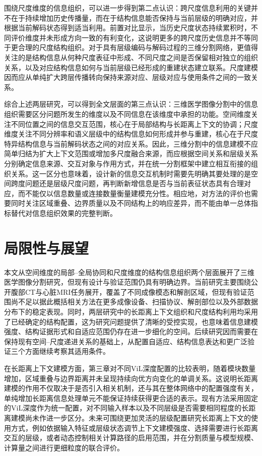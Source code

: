 围绕尺度维度的信息组织，可以进一步得到第二点认识：跨尺度信息利用的关键并不在于持续增加历史传播量，而在于结构信息能否保持与当前层级的明确对应，并根据当前解码状态得到适当利用。前置对比显示，当历史尺度状态持续累积时，不同评价维度并未形成方向一致的有利变化，这说明更多的跨尺度历史信息并不等同于更合理的尺度结构组织。对于具有层级编码与解码过程的三维分割网络，更值得关注的是结构信息从何种尺度表征中形成、不同尺度之间是否保留相对独立的组织关系，以及对应结构信息如何与当前层级已经形成的重建状态建立联系。尺度建模因而应从单纯扩大跨层传播转向保持来源对应、层级对应与使用条件之间的一致关系。

综合上述两层研究，可以得到全文层面的第三点认识：三维医学图像分割中的信息组织需要区分问题所发生的维度以及不同信息在该维度中承担的功能。空间维度关注不同位置之间的信息交互范围，核心在于局部结构与长距离上下文的协调；尺度维度关注不同分辨率和语义层级中的结构信息如何形成并参与重建，核心在于尺度特异结构信息与当前解码状态之间的对应关系。因此，三维分割中的信息建模不应简单归结为扩大上下文范围或增加多尺度融合来源，而应根据空间关系和层级关系分别确定信息来源、交互对象与作用方式，并在统一分割框架中建立相互衔接的组织关系。这一区分也意味着，设计新的信息交互机制时需要先明确其要处理的是空间跨度问题还是层级尺度问题，再判断新增信息是否与当前表征状态具有合理对应，而不能仅以信息数量或连接数量衡量建模充分性。相应地，对方法的评价也需要同时关注区域重叠、边界质量以及不同结构上的响应差异，而不能由单一总体指标替代对信息组织效果的完整判断。

\section{局限性与展望}

本文从空间维度的局部--全局协同和尺度维度的结构信息组织两个层面展开了三维医学图像分割研究，但现有设计与验证范围仍具有明确边界。当前研究主要围绕公开腹部CT与心脏MRI任务展开，覆盖了不同成像模态和解剖区域，但现有验证范围尚不足以据此概括相关方法在更多成像设备、扫描协议、解剖部位以及外部数据分布下的稳定表现。同时，两层研究中的长距离上下文组织和尺度结构利用均采用了已经确定的结构配置，这为研究问题提供了清晰的受控实现，也意味着信息建模强度、结构证据形式和自适应范围仍存在进一步细化的空间。后续研究因而需要在保持现有空间--尺度递进关系的基础上，从配置自适应、结构信息表达和更广泛验证三个方面继续考察其适用条件。

在长距离上下文建模方面，第三章对不同ViL深度配置的比较表明，随着模块数量增加，区域重叠与边界距离并未呈现持续向优方向变化的单调关系。这说明长距离建模的作用不仅取决于是否引入相关机制，还与其在整体网络中的配置强度有关，单纯增加长距离信息处理单元不能保证持续获得更合适的表示。现有方法采用固定的ViL深度作为统一配置，对不同输入样本以及不同层级是否需要相同程度的长距离建模尚未作进一步区分。未来可围绕更加灵活的层级配置研究长距离上下文的使用方式，例如依据输入特征或层级状态调节上下文建模强度、选择需要进行长距离交互的层级，或者动态控制相关计算路径的启用范围，并在分割质量与模型规模、计算量之间进行更细粒度的联合评价。

